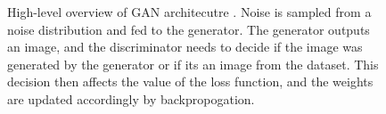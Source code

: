 \begin{figure}
{
    }
    \caption{High-level overview of GAN architecutre \cite{gan}. Noise is sampled from a noise distribution and fed to the generator. The generator outputs an image, and the discriminator needs to decide if the image was generated by the generator or if its an image from the dataset. This decision then affects the value of the loss function, and the weights are updated accordingly by backpropogation.}
    \label{fig:gan_architecture_highlevel}
\end{figure}